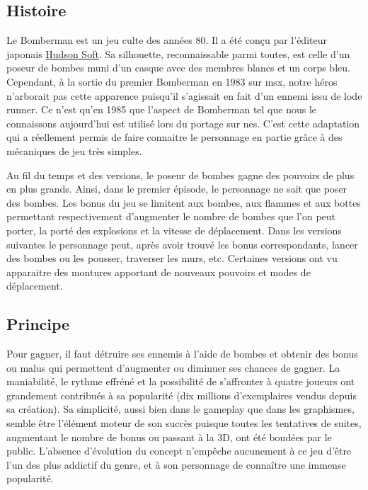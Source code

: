 
\subsection{Histoire}

Le Bomberman est un jeu culte des années 80. Il a été conçu par l'éditeur japonais \href{http://www.hudsonsoft.net/}{Hudson Soft}. Sa silhouette, reconnaissable parmi toutes, est celle d'un poseur de bombes muni d'un casque avec des membres blancs et un corps bleu. Cependant, à la sortie du premier Bomberman en 1983 sur \gls{msx}, notre héros n'arborait pas cette apparence puisqu'il s'agissait en fait d'un ennemi issu de \gls{lode runner}. Ce n'est qu'en 1985 que l'aspect de Bomberman tel que nous le connaissons aujourd'hui est utilisé lors du portage sur \gls{nes}. C'est cette adaptation qui a réellement permis de faire connaitre le personnage en partie grâce à des mécaniques de jeu très simples.

Au fil du temps et des versions, le poseur de bombes gagne des pouvoirs de plus en plus grands. Ainsi, dans le premier épisode, le personnage ne sait que poser des bombes. Les bonus du jeu se limitent aux bombes, aux flammes et aux bottes permettant respectivement d'augmenter le nombre de bombes que l'on peut porter, la porté des explosions et la vitesse de déplacement. Dans les versions suivantes le personnage peut, après avoir trouvé les bonus correspondants, lancer des bombes ou les pousser, traverser les murs, etc. Certaines versions ont vu apparaitre des montures apportant de nouveaux pouvoirs et modes de déplacement.


\subsection{Principe}
Pour gagner, il faut détruire ses ennemis à l'aide de bombes et obtenir des bonus ou malus qui permettent d'augmenter ou diminuer ses chances de gagner. La maniabilité, le rythme effréné et la possibilité de s’affronter à quatre joueurs ont grandement contribués à sa popularité (dix millions d’exemplaires vendus depuis sa création). Sa simplicité, aussi bien dans le gameplay que dans les graphismes, semble être l’élément moteur de son succès puisque toutes les tentatives de suites, augmentant le nombre de bonus ou passant à la 3D, ont été boudées par le public. L’absence d’évolution du concept n’empêche aucunement à ce jeu d’être l’un des plus addictif du genre, et à son personnage de connaître une immense popularité. 